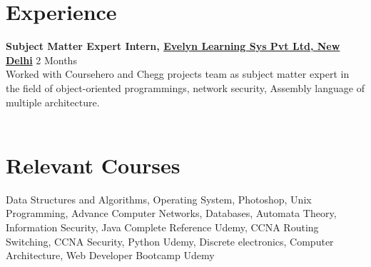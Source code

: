\documentclass[margin, centered]{res}
\begin{document}
\begin{resume}
\section{Experience}
\textbf{Subject Matter Expert Intern, \href{https://evelynlearning.com/}{Evelyn Learning Sys Pvt Ltd, New Delhi}} \hfill 2 Months\\
Worked with Coursehero and Chegg projects team as subject matter expert in the field of object-oriented programmings, network security, Assembly language of multiple architecture. \\
\\

\section{Relevant \hspace{2mm} Courses}
Data Structures and Algorithms, Operating System, Photoshop, Unix Programming, Advance Computer Networks, Databases, Automata Theory, Information Security, Java Complete Reference Udemy, CCNA Routing Switching, CCNA Security, Python Udemy, Discrete electronics, Computer Architecture, Web Developer Bootcamp Udemy
\vspace{3mm}

\end{resume}
\end{document}
